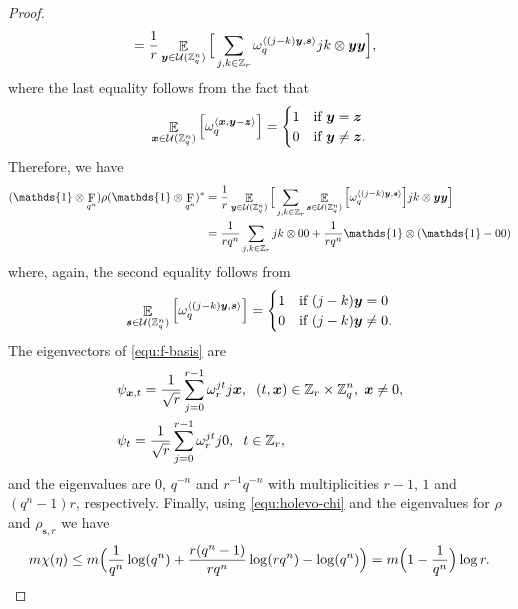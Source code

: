 \documentclass[11pt]{article}
\theoremstyle{plain}
\theoremstyle{definition}
\DeclareMathOperator{\qft}{F}
\DeclareMathOperator{\E}{\mathbb{E}}
\let\ket\relax
\DeclarePairedDelimiter{\ket}{\lvert}{\rangle}
\let\bra\relax
\DeclarePairedDelimiter{\bra}{\langle}{\rvert}
\DeclarePairedDelimiter{\lrang}{\langle}{\rangle}
\def\Z{\mathbb{Z}}
\def\U{\mathcal{U}}
\begin{document}
\begin{proof}
\begin{align*}
        & = \frac{1}{r} \E_{\bm{y} \in \U(\Z_q^n)} \Big[ \sum_{j, k \in \Z_r} \omega_q^{\lrang{(j - k)\bm{y}, \bm{s}}} \ket{j}\bra{k} \otimes \ket{\bm{y}}\bra{\bm{y}} \Big],
    \end{align*}
    where the last equality follows from the fact that
    \[
    \E_{\bm{x} \in \U(\Z_q^n)} \Big[ \omega_q^{\lrang{\bm{x}, \bm{y} - \bm{z}}} \Big] =
    \begin{cases}
        1 & \text{if } \bm{y} = \bm{z} \\
        0 & \text{if } \bm{y} \ne \bm{z}.
    \end{cases}
    \]
    Therefore, we have 
    \begin{align}
        (\mathds{1} \otimes \qft_{q^n}) \rho (\mathds{1} \otimes \qft_{q^n})^*
        & = \frac{1}{r} \E_{\bm{y} \in \U(\Z_q^n)} \Big[ \sum_{j, k \in \Z_r} \E_{\bm{s} \in \U(\Z_q^n)} \Big[ \omega_q^{\lrang{(j - k)\bm{y}, \bm{s}}} \Big] \ket{j}\bra{k} \otimes \ket{\bm{y}}\bra{\bm{y}} \Big] \nonumber \\
        & = \frac{1}{rq^n} \sum_{j, k \in \Z_r} \ket{j}\bra{k} \otimes \ket{0}\bra{0} + \frac{1}{rq^n} \mathds{1} \otimes (\mathds{1} - \ket{0}\bra{0}) \label{equ:f-basis}
    \end{align}
    where, again, the second equality follows from
    \[
    \E_{\bm{s} \in \U(\Z_q^n)} \Big[ \omega_q^{\lrang{(j - k)\bm{y}, \bm{s}}} \Big] = 
    \begin{cases}
        1 & \text{if } (j - k)\bm{y} = 0 \\
        0 & \text{if } (j - k)\bm{y} \ne 0.
    \end{cases}
    \]
    The eigenvectors of \eqref{equ:f-basis} are
    \begin{align*}
        & \ket{\psi_{\bm{x}, t}} = \frac{1}{\sqrt{r}} \sum_{j = 0}^{r - 1} \omega_r^{jt} \ket{j}\ket{\bm{x}}, \hspace*{2mm} (t, \bm{x}) \in \Z_r \times \Z_q^n, \hspace*{1mm} \bm{x} \ne 0, \\
        & \ket{\psi_t} = \frac{1}{\sqrt{r}} \sum_{j = 0}^{r - 1} \omega_r^{jt} \ket{j}\ket{0}, \hspace*{2mm} t \in \Z_r,
    \end{align*}
    and the eigenvalues are $0$, $q^{-n}$ and $r^{-1}q^{-n}$ with multiplicities $r - 1$, $1$ and $(q^n - 1)r$, respectively. Finally, using \eqref{equ:holevo-chi} and the eigenvalues for $\rho$ and $\rho_{\bm{s}, r}$ we have
    \[ m\chi(\eta) \le m\Big( \frac{1}{q^n}\log(q^n) + \frac{r(q^n - 1)}{rq^n}\log(rq^n) - \log(q^n) \Big) = m\Big( 1 - \frac{1}{q^n} \Big)\log r. \qedhere \]
\end{proof}
\end{document}
